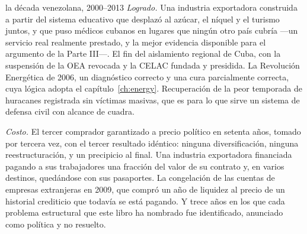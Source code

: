 \begin{ledger}{la década venezolana, 2000--2013}
\emph{Logrado.} Una industria exportadora construida a partir del sistema
educativo que desplazó al azúcar, el níquel y el turismo juntos, y que puso
médicos cubanos en lugares que ningún otro país cubría ---un servicio real
realmente prestado, y la mejor evidencia disponible para el argumento de la Parte
III---. El fin del aislamiento regional de Cuba, con la suspensión de la OEA
revocada y la CELAC fundada y presidida. La Revolución Energética de 2006, un
diagnóstico correcto y una cura parcialmente correcta, cuya lógica adopta el
capítulo~\ref{ch:energy}. Recuperación de la peor temporada de huracanes
registrada sin víctimas masivas, que es para lo que sirve un sistema de defensa
civil con alcance de cuadra.

\emph{Costo.} El tercer comprador garantizado a precio político en setenta años,
tomado por tercera vez, con el tercer resultado idéntico: ninguna
diversificación, ninguna reestructuración, y un precipicio al final. Una
industria exportadora financiada pagando a sus trabajadores una fracción del
valor de su contrato y, en varios destinos, quedándose con sus pasaportes. La
congelación de las cuentas de empresas extranjeras en 2009, que compró un año de
liquidez al precio de un historial crediticio que todavía se está pagando. Y trece
años en los que cada problema estructural que este libro ha nombrado fue
identificado, anunciado como política y no resuelto.
\end{ledger}

